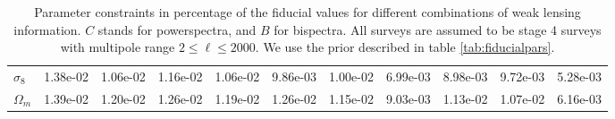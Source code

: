 \documentclass[11pt]{article} %
\begin{document}
\begin{table}
\begin{tabular}{|l|r|rrr|rrr|rrr|}
        $\sigma_8$ &    1.38e-02 &  1.06e-02 &  1.16e-02 &        1.06e-02 & 9.86e-03 & 1.00e-02 &      6.99e-03 &      8.98e-03 &      9.72e-03 &             5.28e-03 \\
        $\Omega_m$ &    1.39e-02 &  1.20e-02 &  1.26e-02 &        1.19e-02 & 1.26e-02 & 1.15e-02 &      9.03e-03 &      1.13e-02 &      1.07e-02 &             6.16e-03 \\
       \hline
        \end{tabular}
\caption{Parameter constraints in percentage of the fiducial values for different combinations of weak lensing information. $C$ stands for powerspectra, and $B$ for bispectra. All surveys are assumed to be stage 4 surveys with multipole range $2 \leq \ell \leq 2000$. We use the prior described in table \ref{tab:fiducialpars}.}
\label{tab:paramconstraintstight}
\end{table}
\end{document}
